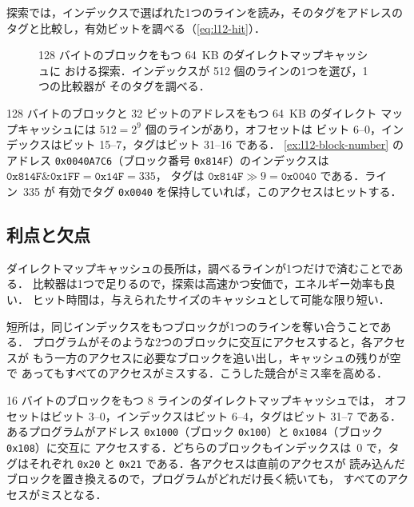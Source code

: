 \documentclass[../main.tex]{subfiles}
\begin{document}
探索では，インデックスで選ばれた1つのラインを読み，そのタグをアドレスの
タグと比較し，有効ビットを調べる（\cref{eq:l12-hit}）．

\begin{figure}[htbp]
  \centering
  
  \caption{128 バイトのブロックをもつ 64~KB のダイレクトマップキャッシュに
    おける探索．インデックスが 512 個のラインの1つを選び，1つの比較器が
    そのタグを調べる．}
  \label{fig:l12-direct-mapped}
\end{figure}

\begin{example}
  \label{ex:l12-dm-fields}
  128 バイトのブロックと 32 ビットのアドレスをもつ 64~KB のダイレクト
  マップキャッシュには $512 = 2^{9}$ 個のラインがあり，オフセットは
  ビット 6--0，インデックスはビット 15--7，タグはビット 31--16 である．
  \cref{ex:l12-block-number} のアドレス \texttt{0x0040A7C6}（ブロック番号
  \texttt{0x814F}）のインデックスは
  $\texttt{0x814F} \mathbin{\&} \texttt{0x1FF} = \texttt{0x14F} = 335$，
  タグは $\texttt{0x814F} \gg 9 = \texttt{0x0040}$ である．ライン~335 が
  有効でタグ \texttt{0x0040} を保持していれば，このアクセスはヒットする．
\end{example}

\subsection{利点と欠点}

ダイレクトマップキャッシュの長所は，調べるラインが1つだけで済むことである．
比較器は1つで足りるので，探索は高速かつ安価で，エネルギー効率も良い．
ヒット時間は，与えられたサイズのキャッシュとして可能な限り短い．

短所は，同じインデックスをもつブロックが1つのラインを奪い合うことである．
プログラムがそのような2つのブロックに交互にアクセスすると，各アクセスが
もう一方のアクセスに必要なブロックを追い出し，キャッシュの残りが空で
あってもすべてのアクセスがミスする．こうした競合がミス率を高める．

\begin{example}
  \label{ex:l12-dm-conflict}
  16 バイトのブロックをもつ 8 ラインのダイレクトマップキャッシュでは，
  オフセットはビット 3--0，インデックスはビット 6--4，タグはビット 31--7
  である．あるプログラムがアドレス \texttt{0x1000}（ブロック
  \texttt{0x100}）と \texttt{0x1084}（ブロック \texttt{0x108}）に交互に
  アクセスする．どちらのブロックもインデックスは~0 で，タグはそれぞれ
  \texttt{0x20} と \texttt{0x21} である．各アクセスは直前のアクセスが
  読み込んだブロックを置き換えるので，プログラムがどれだけ長く続いても，
  すべてのアクセスがミスとなる．
\end{example}
\end{document}

